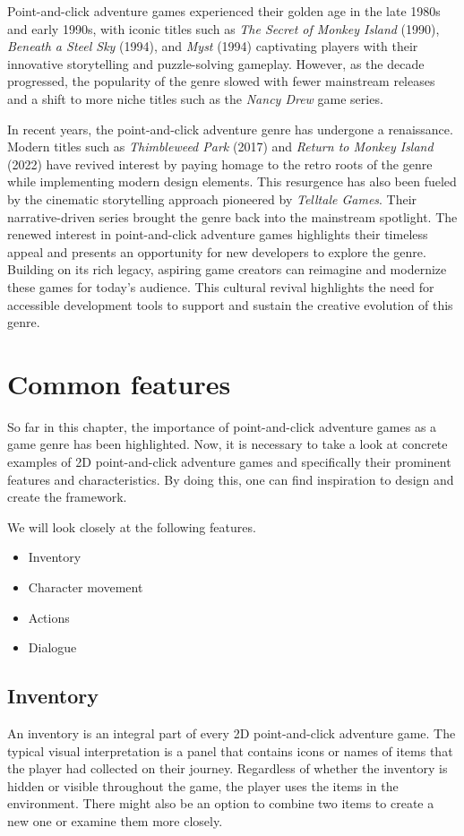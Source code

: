 Point-and-click adventure games experienced their golden age in the late 1980s and early 1990s, with iconic titles such as \textit{The Secret of Monkey Island} (1990), \textit{Beneath a Steel Sky} (1994), and \textit{Myst} (1994) captivating players with their innovative storytelling and puzzle-solving gameplay. However, as the decade progressed, the popularity of the genre slowed\cite{Qaffas202022} with fewer mainstream releases and a shift to more niche titles such as the \textit{Nancy Drew} game series.

In recent years, the point-and-click adventure genre has undergone a renaissance. Modern titles such as \textit{Thimbleweed Park} (2017) and \textit{Return to Monkey Island} (2022) have revived interest by paying homage to the retro roots of the genre while implementing modern design elements. This resurgence has also been fueled by the cinematic storytelling approach pioneered by \textit{Telltale Games}. Their narrative-driven series brought the genre back into the mainstream spotlight. The renewed interest in point-and-click adventure games highlights their timeless appeal and presents an opportunity for new developers to explore the genre. Building on its rich legacy, aspiring game creators can reimagine and modernize these games for today's audience. This cultural revival highlights the need for accessible development tools to support and sustain the creative evolution of this genre.

\section{Common features}
So far in this chapter, the importance of point-and-click adventure games as a game genre has been highlighted. Now, it is necessary to take a look at concrete examples of 2D point-and-click adventure games and specifically their prominent features and characteristics. By doing this, one can find inspiration to design and create the framework.

We will look closely at the following features.
\begin{itemize}
\item Inventory
\item Character movement
\item Actions
\item Dialogue
\end{itemize}

\subsection{Inventory}
An inventory is an integral part of every 2D point-and-click adventure game. The typical visual interpretation is a panel that contains icons or names of items that the player had collected on their journey. Regardless of whether the inventory is hidden or visible throughout the game, the player uses the items in the environment. There might also be an option to combine two items to create a new one or examine them more closely. 

